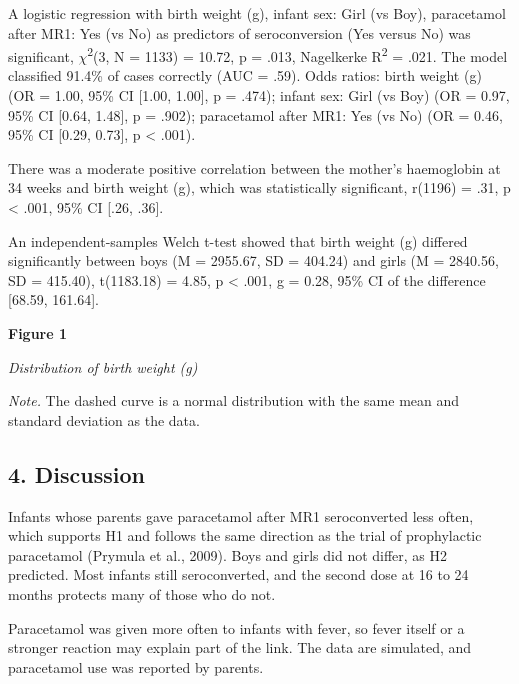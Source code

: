 \documentclass[12pt]{article}
\begin{document}
A logistic regression with birth weight (g), infant sex: Girl (vs Boy), paracetamol after MR1: Yes (vs No) as predictors of seroconversion (Yes versus No) was significant, \ensuremath{\chi}\textsuperscript{2}(3, N = 1133) = 10.72, p = .013, Nagelkerke R\textsuperscript{2} = .021. The model classified 91.4\% of cases correctly (AUC = .59). Odds ratios: birth weight (g) (OR = 1.00, 95\% CI [1.00, 1.00], p = .474); infant sex: Girl (vs Boy) (OR = 0.97, 95\% CI [0.64, 1.48], p = .902); paracetamol after MR1: Yes (vs No) (OR = 0.46, 95\% CI [0.29, 0.73], p < .001).

There was a moderate positive correlation between the mother's haemoglobin at 34 weeks and birth weight (g), which was statistically significant, r(1196) = .31, p < .001, 95\% CI [.26, .36].

An independent-samples Welch t-test showed that birth weight (g) differed significantly between boys (M = 2955.67, SD = 404.24) and girls (M = 2840.56, SD = 415.40), t(1183.18) = 4.85, p < .001, g = 0.28, 95\% CI of the difference [68.59, 161.64].

\textbf{Figure 1}

\textit{Distribution of birth weight (g)}


\textit{Note.} The dashed curve is a normal distribution with the same mean and standard deviation as the data.

\newline{}

\subsection{4. Discussion}

Infants whose parents gave paracetamol after MR1 seroconverted less often, which supports H1 and follows the same direction as the trial of prophylactic paracetamol (Prymula et al., 2009). Boys and girls did not differ, as H2 predicted. Most infants still seroconverted, and the second dose at 16 to 24 months protects many of those who do not.

Paracetamol was given more often to infants with fever, so fever itself or a stronger reaction may explain part of the link. The data are simulated, and paracetamol use was reported by parents.
\end{document}
